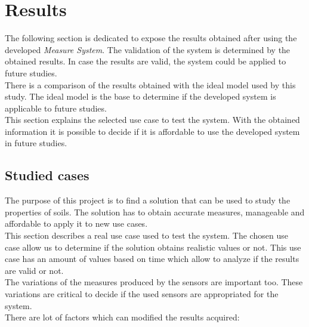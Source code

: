 
\chapter{Results}
\newpage

The following section is dedicated to expose the results obtained after using the developed \textit{Measure System}. The validation of the system is determined by the obtained results. In case the results are valid, the system could be applied to future studies.\\

There is a comparison of the results obtained with the ideal model used by this study. The ideal model is the base to determine if the developed system is applicable to future studies.\\

This section explains the selected use case to test the system. With the obtained information it is possible to decide if it is affordable to use the developed system in future studies.

\section{Studied cases}

The purpose of this project is to find a solution that can be used to study the properties of soils. The solution has to obtain accurate measures, manageable and affordable to apply it to new use cases.\\

This section describes a real use case used to test the system. The chosen use case allow us to determine if the solution obtains realistic values or not. This use case has an amount of values based on time which allow to analyze if the results are valid or not.\\

The variations of the measures produced by the sensors are important too. These variations are critical to decide if the used sensors are appropriated for the system.\\

There are lot of factors which can modified the results acquired:

